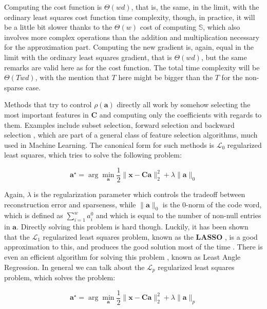 \documentclass[12pt,a4paper,oneside,english]{UPBThesis}
\begin{document}
Computing the cost function is $\Theta(wd)$, that is, the same, in the limit, with the ordinary least squares cost function time complexity, though, in practice, it will be a little bit slower thanks to the $\Theta(w)$ cost of computing $\mathbb{S}$, which also involves more complex operations than the addition and multiplication necessary for the approximation part. Computing the new gradient is, again, equal in the limit with the ordinary least squares gradient, that is $\Theta(wd)$, but the same remarks are valid here as for the cost function. The total time complexity will be $\Theta(Twd)$, with the mention that $T$ here might be bigger than the $T$ for the non-sparse case.

Methods that try to control $\rho(\textbf{a})$ directly all work by somehow selecting the most important features in $\textbf{C}$ and computing only the coefficients with regards to them. Examples include subset selection, forward selection and backward selection \cite{elements-statistical-learning}, which are part of a general class of feature selection algorithms, much used in Machine Learning. The canonical form for such methods is $\mathcal{L}_0$ regularized least squares, which tries to solve the following problem:

\begin{equation*}
\textbf{a}^{\star} = \arg\min_{\textbf{a}} \frac{1}{2} \| \textbf{x} - \textbf{C}\textbf{a} \|_2^2 + \lambda \| \textbf{a} \|_0
\end{equation*}

Again, $\lambda$ is the regularization parameter which controls the tradeoff between reconstruction error and sparseness, while $\|\textbf{a}\|_0$ is the $0$-norm of the code word, which is defined as $\sum_{i=1}^{w}a_i^0$ and which is equal to the number of non-null entries in $\textbf{a}$. Directly solving this problem is hard though. Luckily, it has been shown that the $\mathcal{L}_1$ regularized least squares problem, known as the \textbf{LASSO} \cite{lasso}, is a good approximation to this, and produces the good solution most of the time \cite{undetermined-minimal-L1}. There is even an efficient algorithm for solving this problem \cite{least-angle-regression}, known as Least Angle Regression. In general we can talk about the $\mathcal{L}_p$ regularized least squares problem, which solves the problem:

\begin{equation*}
\textbf{a}^{\star} = \arg\min_{\textbf{a}} \frac{1}{2} \| \textbf{x} - \textbf{C}\textbf{a} \|_2^2 + \lambda \| \textbf{a} \|_p
\end{equation*}
\end{document}
